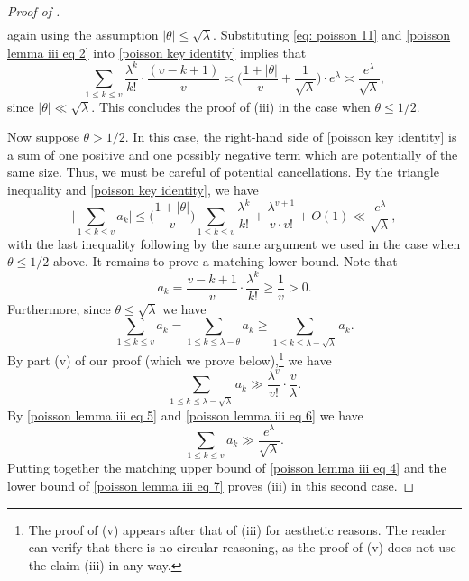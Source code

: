 \documentclass{amsart}
\theoremstyle{definition}
\numberwithin{equation}{section}
\begin{document}
\begin{proof}[Proof of ]
\begin{align}
	\end{align}
	again using the assumption $|\theta| \le \sqrt{\lambda}$. Substituting \eqref{eq: poisson 11} and \eqref{poisson lemma iii eq 2} into \eqref{poisson key identity} implies that
	$$\sum_{1 \leq k \leq v}\frac{\lambda^k}{k!}\cdot\frac{(v-k+1)}{v} \asymp \bigg(\frac{1 + |\theta| }{v} + \frac{1}{\sqrt{\lambda}}\bigg)\cdot e^\lambda \asymp \frac{e^\lambda}{\sqrt{\lambda}},$$
	since $|\theta| \ll \sqrt{\lambda}$. This concludes the proof of (iii) in the case when $\theta \leq 1/2$. \par Now suppose $\theta > 1/2$. In this case, the right-hand side of \eqref{poisson key identity} is a sum of one positive and one possibly negative term which are potentially of the same size. Thus, we must be careful of potential cancellations. By the triangle inequality and \eqref{poisson key identity}, we have
	\begin{equation}\label{poisson lemma iii eq 4}
		\bigg|\sum_{1 \leq k \leq v}a_k \bigg| \leq \bigg(\frac{1+|\theta|}{v}\bigg)\sum_{1 \leq k \leq  v}\frac{\lambda^k}{k!} + \frac{\lambda^{v+1}}{v\cdot v!} +O(1) \ll \frac{e^\lambda}{\sqrt{\lambda}},
	\end{equation}
	with the last inequality following by the same argument we used in the case when $\theta\le 1/2$ above.
	It remains to prove a matching lower bound. Note that $$a_k = \frac{v-k+1}{v} \cdot \frac{\lambda^k}{k!} \geq \frac{1}{v} > 0.$$
	Furthermore, since $\theta \leq \sqrt{\lambda}$ we have
	\begin{equation} \label{poisson lemma iii eq 5}
		\sum_{1 \leq k \leq v}a_k = \sum_{1 \leq k \leq \lambda -\theta}a_k \geq \sum_{1 \leq k \leq \lambda -\sqrt{\lambda}} a_k.
	\end{equation}
	\noindent By part (v) of our proof (which we prove below),\footnote{The proof of (v) appears after that of (iii) for aesthetic reasons. The reader can verify that there is no circular reasoning, as the proof of (v) does not use the claim (iii) in any way.} we have
	\begin{equation}\label{poisson lemma iii eq 6}
		\sum_{1 \leq k \leq \lambda - \sqrt{\lambda}} a_k \gg \frac{\lambda^v}{v!}\cdot \frac{v}{\lambda}.
	\end{equation}
	By \eqref{poisson lemma iii eq 5} and \eqref{poisson lemma iii eq 6} we have 
	\begin{equation}\label{poisson lemma iii eq 7}
		\sum_{1 \leq k \leq v} a_k \gg \frac{e^\lambda}{\sqrt{\lambda}}.
	\end{equation}
	Putting together the matching upper bound of \eqref{poisson lemma iii eq 4} and the lower bound of \eqref{poisson lemma iii eq 7} proves (iii) in this second case. 
	

\end{proof}
\end{document}

